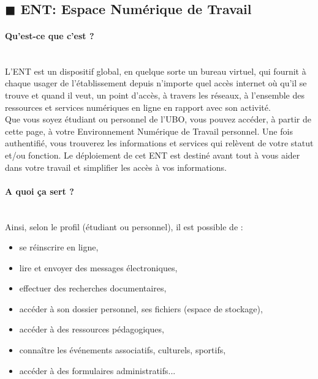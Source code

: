 \documentclass[11pt]{article}
\newcommand{\mysubsection}[1]
{~\\
{\noindent
\begin{minipage}{\linewidth}
\subsection*{$\blacksquare$ #1}
\end{minipage}
}
}
\begin{document}
{{\begin{figure}[h]
\centering
\end{figure}

\clearpage


\mysubsection{ENT: Espace Numérique de Travail}
\vspace{-0.5cm}
\begin{multicols*}{2}
\raggedcolumns
\paragraph{Qu'est-ce que c'est ?}~\\

L'ENT est un dispositif global, en quelque sorte un bureau virtuel, qui fournit à chaque usager de l'établissement depuis n'importe quel accès internet où qu'il se trouve et quand il veut, un point d'accès, à travers les réseaux, à l'ensemble des ressources et services numériques en ligne en rapport avec son activité.\\

Que vous soyez étudiant ou personnel de l'UBO, vous pouvez accéder, à partir de cette page, à votre Environnement Numérique de Travail personnel. Une fois authentifié, vous trouverez les informations et services qui relèvent de votre statut et/ou fonction.
Le déploiement de cet ENT est destiné avant tout à vous aider dans votre travail et simplifier les accès à vos informations.

\paragraph{A quoi ça sert ?}~\\

Ainsi, selon le profil (étudiant ou personnel), il est possible de :
\begin{itemize}
\item se réinscrire en ligne,
\item lire et envoyer des messages électroniques,
\item effectuer des recherches documentaires,
\item accéder à son dossier personnel, ses fichiers (espace de stockage),
\item accéder à des ressources pédagogiques,
\item connaître les événements associatifs, culturels, sportifs,
\item accéder à des formulaires administratifs...
\end{itemize}


\end{multicols*}}}
\end{document}
